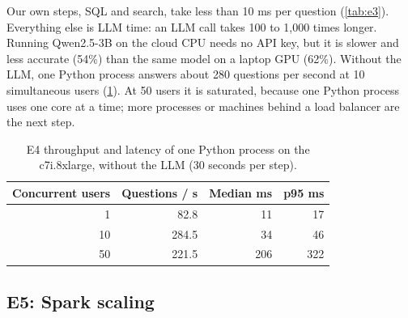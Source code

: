 Our own steps, SQL and search, take less than 10 ms per question (\cref{tab:e3}). Everything else is
LLM time: an LLM call takes 100 to 1,000 times longer. Running Qwen2.5-3B on the cloud CPU needs no
API key, but it is slower and less accurate (54\%) than the same model on a laptop GPU (62\%). Without
the LLM, one Python process answers about 280 questions per second at 10 simultaneous users
(\cref{tab:e4}). At 50 users it is saturated, because one Python process uses one core at a time;
more processes or machines behind a load balancer are the next step.

\begin{table}[ht]
\centering\small
\begin{tabular}{rrrr}
\toprule
Concurrent users & Questions / s & Median ms & p95 ms \\
\midrule
1  & 82.8  & 11  & 17 \\
10 & 284.5 & 34  & 46 \\
50 & 221.5 & 206 & 322 \\
\bottomrule
\end{tabular}
\caption{E4 throughput and latency of one Python process on the c7i.8xlarge, without the LLM
(30 seconds per step).}
\label{tab:e4}
\end{table}

\subsection{E5: Spark scaling}
\label{sec:e5}

